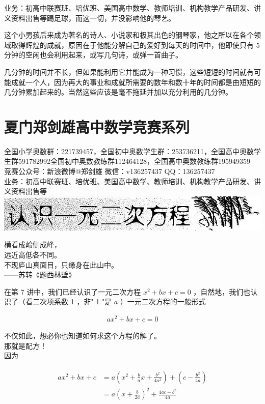 \documentclass[10pt]{article}
\begin{document}
业务：初高中联赛班、培优班、美国高中数学、教师培训、机构教学产品研发、讲义资料出售等踢足球，而这一切，并没影响他的琴艺。

这个小男孩后来成为著名的诗人、小说家和极其出色的钢琴家，他之所以在各个领域取得辉煌的成就，原因在于他能分解自己的爱好到每天的时间中，他即使只有 5 分钟的空闲也会利用起来，或写几句诗，或弹一首曲子。

几分钟的时间并不长，但如果能利用它并能成为一种习惯，这些短短的时间就有可能成就一个人，因为再大的事业和成就所需要的数年和数十年的时间都是由短短的几分钟累加起来的。当然这些应该是毫不拖延并加以充分利用的几分钟。

\section*{夏门郑剑雄高中数学竞赛系列}
全国小学奥数群：221739457，全国初中奥数学生群：253736211，全国高中奥数学生群591782992全国初中奥数教练群112464128，全国高中奥数教练群195949359\\
竞赛公众号：新浪微博@郑剑雄 微信：v136257437 QQ：136257437\\
业务：初高中联赛班、培优班、美国高中数学、教师培训、机构教学产品研发、讲义资料出售等\\
\includegraphics[max width=\textwidth, center]{2024_10_30_26b590fd1106d28139f0g-047}

横看成岭侧成峰，\\
远近高低各不同。\\
不现庐山真面目，只缘身在此山中。\\
——苏转《题西林壁》

在第 7 讲中，我们已经认识了一元二次方程 $x^{2}+b x+c=0$ ，自然地，我们也认识了（看二次项系数 1 ，非" 1 "是 $a$ ）一元二次方程的一般形式

\begin{align*}
a x^{2}+b x+c=0
\end{align*}

不仅如此，想必你也知道如何求这个方程的解了。\\
那就是配方！\\
因为

\begin{align*}
\begin{aligned}
a x^{2}+b x+c & =a\left(x^{2}+\frac{b}{a} x+\frac{b^{2}}{4 a^{2}}\right)+\left(c-\frac{b^{2}}{4 a}\right) \\
& =a\left(x+\frac{b}{2 a}\right)^{2}+\frac{4 a c-b^{2}}{4 a}
\end{aligned}
\end{align*}
\end{document}
